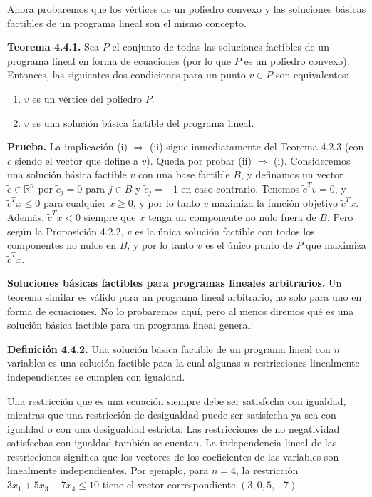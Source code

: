 \documentclass{article}
\begin{document}
Ahora probaremos que los vértices de un poliedro convexo y las soluciones básicas factibles de un programa lineal son el mismo concepto.

\textbf{Teorema 4.4.1.} Sea \( P \) el conjunto de todas las soluciones factibles de un programa lineal en forma de ecuaciones (por lo que \( P \) es un poliedro convexo). Entonces, las siguientes dos condiciones para un punto \( v \in P \) son equivalentes:
\begin{enumerate}
    \item \( v \) es un vértice del poliedro \( P \).
    \item \( v \) es una solución básica factible del programa lineal.
\end{enumerate}

\textbf{Prueba.} La implicación (i) \(\Rightarrow\) (ii) sigue inmediatamente del Teorema 4.2.3 (con \( c \) siendo el vector que define a \( v \)). Queda por probar (ii) \(\Rightarrow\) (i). Consideremos una solución básica factible \( v \) con una base factible \( B \), y definamos un vector \( \tilde{c} \in \mathbb{R}^n \) por \( \tilde{c}_j = 0 \) para \( j \in B \) y \( \tilde{c}_j = -1 \) en caso contrario. Tenemos \( \tilde{c}^T v = 0 \), y \( \tilde{c}^T x \leq 0 \) para cualquier \( x \geq 0 \), y por lo tanto \( v \) maximiza la función objetivo \( \tilde{c}^T x \). Además, \( \tilde{c}^T x < 0 \) siempre que \( x \) tenga un componente no nulo fuera de \( B \). Pero según la Proposición 4.2.2, \( v \) es la única solución factible con todos los componentes no nulos en \( B \), y por lo tanto \( v \) es el único punto de \( P \) que maximiza \( \tilde{c}^T x \).

\textbf{Soluciones básicas factibles para programas lineales arbitrarios.} Un teorema similar es válido para un programa lineal arbitrario, no solo para uno en forma de ecuaciones. No lo probaremos aquí, pero al menos diremos qué es una solución básica factible para un programa lineal general:

\textbf{Definición 4.4.2.} Una solución básica factible de un programa lineal con \( n \) variables es una solución factible para la cual algunas \( n \) restricciones linealmente independientes se cumplen con igualdad.

Una restricción que es una ecuación siempre debe ser satisfecha con igualdad, mientras que una restricción de desigualdad puede ser satisfecha ya sea con igualdad o con una desigualdad estricta. Las restricciones de no negatividad satisfechas con igualdad también se cuentan. La independencia lineal de las restricciones significa que los vectores de los coeficientes de las variables son linealmente independientes. Por ejemplo, para \( n = 4 \), la restricción \( 3x_1 + 5x_3 - 7x_4 \leq 10 \) tiene el vector correspondiente \( (3, 0, 5, -7) \). 
\end{document}
